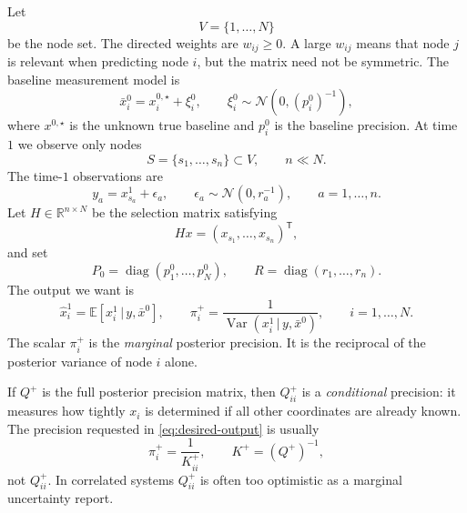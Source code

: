 \documentclass[11pt]{article}
\numberwithin{equation}{section}
\newcommand{\R}{\mathbb{R}}
\newcommand{\E}{\mathbb{E}}
\newcommand{\Var}{\operatorname{Var}}
\newcommand{\diag}{\operatorname{diag}}
\newcommand{\transpose}{^{\mathsf T}}
\newcommand{\given}{\,|\,}
\begin{document}
Let
\[
  V=\{1,\ldots,N\}
\]
be the node set.  The directed weights are $w_{ij}\ge 0$.  A large $w_{ij}$ means that node $j$ is relevant when predicting node $i$, but the matrix need not be symmetric.  The baseline measurement model is
\begin{equation}
  \bar x_i^0=x_i^{0,\star}+\xi_i^0,
  \qquad
  \xi_i^0\sim\mathcal N(0,(p_i^0)^{-1}),
  \label{eq:baseline-measurement}
\end{equation}
where $x^{0,\star}$ is the unknown true baseline and $p_i^0$ is the baseline precision.  At time $1$ we observe only nodes
\[
  S=\{s_1,\ldots,s_n\}\subset V,
  \qquad n\ll N.
\]
The time-$1$ observations are
\begin{equation}
  y_a=x^1_{s_a}+\epsilon_a,
  \qquad
  \epsilon_a\sim\mathcal N(0,r_a^{-1}),
  \qquad a=1,\ldots,n.
  \label{eq:time-one-observation}
\end{equation}
Let $H\in\R^{n\times N}$ be the selection matrix satisfying
\[
  Hx=(x_{s_1},\ldots,x_{s_n})\transpose,
\]
and set
\begin{equation}
  P_0=\diag(p_1^0,\ldots,p_N^0),
  \qquad
  R=\diag(r_1,\ldots,r_n).
  \label{eq:P0-R}
\end{equation}
The output we want is
\begin{equation}
  \widehat x_i^1=\E[x_i^1\given y,\bar x^0],
  \qquad
  \pi_i^+=\frac{1}{\Var(x_i^1\given y,\bar x^0)},
  \qquad i=1,\ldots,N.
  \label{eq:desired-output}
\end{equation}
The scalar $\pi_i^+$ is the \emph{marginal} posterior precision.  It is the reciprocal of the posterior variance of node $i$ alone.

\begin{warningbox}
If $Q^+$ is the full posterior precision matrix, then $Q^+_{ii}$ is a \emph{conditional} precision: it measures how tightly $x_i$ is determined if all other coordinates are already known.  The precision requested in \eqref{eq:desired-output} is usually
\[
  \pi_i^+=\frac{1}{K^+_{ii}},
  \qquad K^+=(Q^+)^{-1},
\]
not $Q^+_{ii}$.  In correlated systems $Q^+_{ii}$ is often too optimistic as a marginal uncertainty report.
\end{warningbox}
\end{document}
